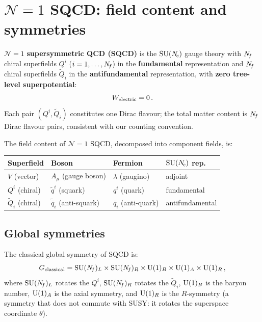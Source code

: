 \documentclass[11pt,a4paper]{article}
\begin{document}
\section{$\mathcal{N}=1$ SQCD: field content and symmetries}
\label{sec:sqcd}

\begin{definition}[$\mathcal{N}=1$ SQCD]
\label{def:sqcd}
$\mathcal{N}=1$ \textbf{supersymmetric QCD (SQCD)} is the $\mathrm{SU}(N_{\!c})$
gauge theory with $N_{\!f}$ chiral superfields $Q^i$ ($i = 1, \ldots, N_{\!f}$)
in the \textbf{fundamental} representation and $N_{\!f}$ chiral superfields
$\widetilde{Q}_i$ in the \textbf{antifundamental} representation, with
\textbf{zero tree-level superpotential}:
\begin{equation}
  W_{\text{electric}} = 0\,.
  \label{eq:W-electric}
\end{equation}
Each pair $(Q^i, \widetilde{Q}_i)$ constitutes one Dirac flavour; the
total matter content is $N_{\!f}$ Dirac flavour pairs, consistent with
our counting convention.
\end{definition}

The field content of $\mathcal{N}=1$ SQCD, decomposed into component
fields, is:

\begin{center}
\renewcommand{\arraystretch}{1.3}
\begin{tabular}{@{}l l l l@{}}
\toprule
\textbf{Superfield} & \textbf{Boson} & \textbf{Fermion} & \textbf{$\mathrm{SU}(N_{\!c})$ rep.} \\
\midrule
$V$ (vector) & $A_\mu$ (gauge boson) & $\lambda$ (gaugino) & adjoint \\
$Q^i$ (chiral) & $\tilde{q}^i$ (squark) & $q^i$ (quark) & fundamental \\
$\widetilde{Q}_i$ (chiral) & $\tilde{\bar{q}}_i$ (anti-squark)
  & $\bar{q}_i$ (anti-quark) & antifundamental \\
\bottomrule
\end{tabular}
\end{center}

\subsection{Global symmetries}
\label{sec:global-sym}

The classical global symmetry of SQCD is:
\begin{equation}
  G_{\text{classical}}
  = \mathrm{SU}(N_{\!f})_L \times \mathrm{SU}(N_{\!f})_R \times \mathrm{U}(1)_B \times \mathrm{U}(1)_A \times \mathrm{U}(1)_R\,,
  \label{eq:global-sym-classical}
\end{equation}
where $\mathrm{SU}(N_{\!f})_L$ rotates the $Q^i$, $\mathrm{SU}(N_{\!f})_R$ rotates the
$\widetilde{Q}_i$, $\mathrm{U}(1)_B$ is the baryon number, $\mathrm{U}(1)_A$ is the
axial symmetry, and $\mathrm{U}(1)_R$ is the $R$-symmetry (a symmetry that
does not commute with SUSY: it rotates the superspace coordinate
$\theta$).
\end{document}

